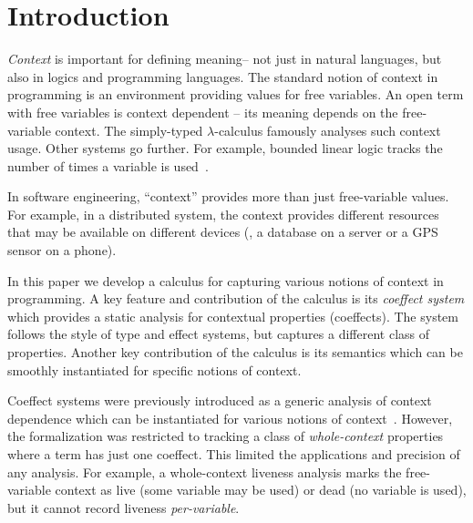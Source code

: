 \newcommand{\fcons}{ \times } 
\newcommand{\fempty}{\epsilon}



\section{Introduction}

\emph{Context} is important for defining meaning-- not just in natural languages, but also in logics and 
programming languages.
The standard notion of context in programming is an environment 
providing values for free variables. An open term with free variables is context dependent -- its 
meaning depends on the free-variable context. The simply-typed $\lambda$-calculus famously 
analyses such context usage. 
Other systems go further. %
For example, bounded linear logic tracks the number of times a 
variable is used~\cite{girard1992bounded}.

In software engineering, ``context'' provides more than just free-variable values. For example, in a
distributed system, the context provides different resources that may be available on different 
devices (\eg{}, a database on a server or a GPS sensor on a phone).

In this paper we develop a calculus for capturing various notions of 
context in programming. A key feature and contribution
of the calculus is its \emph{coeffect system} which provides a static analysis for contextual properties (coeffects). The system
follows the style of type and effect systems, but captures a different class of properties. %
Another key contribution of the calculus is its semantics which can be smoothly instantiated for specific notions of context.

Coeffect systems were previously introduced as a generic analysis of
context dependence which can be instantiated for various notions of
context~\cite{petricek2013coeffects}. However, the formalization was restricted to
tracking a class of \emph{whole-context} properties where a term has just
one coeffect. This limited the applications and precision of any
analysis. For example, a whole-context liveness analysis marks the 
free-variable context as live (some variable may be used) or dead 
(no variable is used), but it cannot record liveness \emph{per-variable}. 

